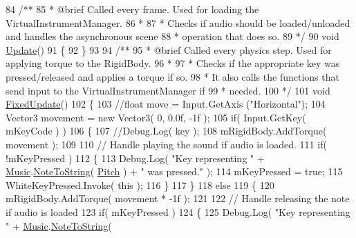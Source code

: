 \begin{DoxyCodeInclude}
84 \textcolor{comment}{    /**}
85 \textcolor{comment}{     * @brief Called every frame. Used for loading the VirtualInstrumentManager.}
86 \textcolor{comment}{     * }
87 \textcolor{comment}{     * Checks if audio should be loaded/unloaded and handles the asynchronous scene}
88 \textcolor{comment}{     * operation that does so.}
89 \textcolor{comment}{     */}
90     \textcolor{keywordtype}{void} \hyperlink{group___white_key_unity_ga160cb397de3ab7084247e7fede943cf7}{Update}()
91     \{
92     \}
93 \textcolor{comment}{}
94 \textcolor{comment}{    /**}
95 \textcolor{comment}{     * @brief Called every physics step. Used for applying torque to the RigidBody.}
96 \textcolor{comment}{     * }
97 \textcolor{comment}{     * Checks if the appropriate key was pressed/released and applies a torque if so.}
98 \textcolor{comment}{     * It also calls the functions that send input to the VirtualInstrumentManager if}
99 \textcolor{comment}{     * needed.}
100 \textcolor{comment}{     */}
101     \textcolor{keywordtype}{void} \hyperlink{group___white_key_unity_ga54ddd22238f4a46b2824eacb90430245}{FixedUpdate}()
102     \{
103         \textcolor{comment}{//float move = Input.GetAxis ("Horizontal");}
104         Vector3 movement = \textcolor{keyword}{new} Vector3( 0, 0.0f, -1f );
105         \textcolor{keywordflow}{if}( Input.GetKey( mKeyCode ) )
106         \{
107             \textcolor{comment}{//Debug.Log( key );}
108             mRigidBody.AddTorque( movement );
109 
110             \textcolor{comment}{// Handle playing the sound if audio is loaded.}
111             \textcolor{keywordflow}{if}( !mKeyPressed )
112             \{
113                 Debug.Log( \textcolor{stringliteral}{"Key representing "} + \hyperlink{class_music}{Music}.\hyperlink{group___music_stat_func_ga85a22c905d56d4c5f4e62159bfecee8c}{NoteToString}( 
      \hyperlink{group___white_key_pub_var_ga1ddd98b85ba069defc7cf47d25f625f4}{Pitch} ) + \textcolor{stringliteral}{" was pressed."} );
114                 mKeyPressed = \textcolor{keyword}{true};
115                 WhiteKeyPressed.Invoke( \textcolor{keyword}{this} );
116             \}
117         \}
118         \textcolor{keywordflow}{else}
119         \{
120             mRigidBody.AddTorque( movement * -1f );
121 
122             \textcolor{comment}{// Handle releasing the note if audio is loaded}
123             \textcolor{keywordflow}{if}( mKeyPressed )
124             \{
125                 Debug.Log( \textcolor{stringliteral}{"Key representing "} + \hyperlink{class_music}{Music}.\hyperlink{group___music_stat_func_ga85a22c905d56d4c5f4e62159bfecee8c}{NoteToString}( 

\end{DoxyCodeInclude}
